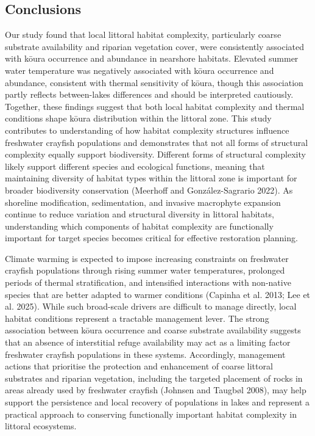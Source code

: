 \documentclass[
  12pt,
  a4paper,
  oneside]{scrbook}
\begin{document}
\subsection{Conclusions}\label{conclusions-1}

Our study found that local littoral habitat complexity, particularly
coarse substrate availability and riparian vegetation cover, were
consistently associated with kōura occurrence and abundance in nearshore
habitats. Elevated summer water temperature was negatively associated
with kōura occurrence and abundance, consistent with thermal sensitivity
of kōura, though this association partly reflects between-lakes
differences and should be interpreted cautiously. Together, these
findings suggest that both local habitat complexity and thermal
conditions shape kōura distribution within the littoral zone. This study
contributes to understanding of how habitat complexity structures
influence freshwater crayfish populations and demonstrates that not all
forms of structural complexity equally support biodiversity. Different
forms of structural complexity likely support different species and
ecological functions, meaning that maintaining diversity of habitat
types within the littoral zone is important for broader biodiversity
conservation (Meerhoff and González-Sagrario 2022). As shoreline
modification, sedimentation, and invasive macrophyte expansion continue
to reduce variation and structural diversity in littoral habitats,
understanding which components of habitat complexity are functionally
important for target species becomes critical for effective restoration
planning.

Climate warming is expected to impose increasing constraints on
freshwater crayfish populations through rising summer water
temperatures, prolonged periods of thermal stratification, and
intensified interactions with non-native species that are better adapted
to warmer conditions (Capinha et al. 2013; Lee et al. 2025). While such
broad-scale drivers are difficult to manage directly, local habitat
conditions represent a tractable management lever. The strong
association between kōura occurrence and coarse substrate availability
suggests that an absence of interstitial refuge availability may act as
a limiting factor freshwater crayfish populations in these systems.
Accordingly, management actions that prioritise the protection and
enhancement of coarse littoral substrates and riparian vegetation,
including the targeted placement of rocks in areas already used by
freshwater crayfish (Johnsen and Taugbøl 2008), may help support the
persistence and local recovery of populations in lakes and represent a
practical approach to conserving functionally important habitat
complexity in littoral ecosystems.
\end{document}
